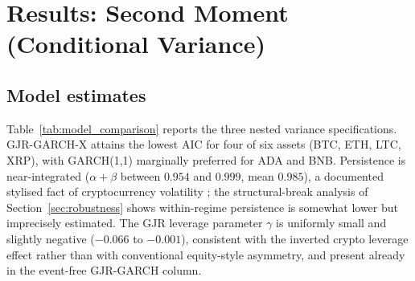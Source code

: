 \documentclass[pdflatex,sn-mathphys-num]{sn-jnl}
\theoremstyle{thmstyleone}
\theoremstyle{thmstyletwo}
\theoremstyle{thmstylethree}
\begin{document}

\section{Results: Second Moment (Conditional Variance)}\label{sec:results_var}

\subsection{Model estimates}

Table~\ref{tab:model_comparison} reports the three nested variance specifications. GJR-GARCH-X attains the lowest AIC for four of six assets (BTC, ETH, LTC, XRP), with GARCH(1,1) marginally preferred for ADA and BNB. Persistence is near-integrated ($\alpha+\beta$ between $0.954$ and $0.999$, mean $0.985$), a documented stylised fact of cryptocurrency volatility \citep{Katsiampa2017, BouriEtAl2017, CheikhEtAl2020}; the structural-break analysis of Section~\ref{sec:robustness} shows within-regime persistence is somewhat lower but imprecisely estimated. The GJR leverage parameter $\gamma$ is uniformly small and slightly negative ($-0.066$ to $-0.001$), consistent with the inverted crypto leverage effect \citep{BaurDimpfl2018} rather than with conventional equity-style asymmetry, and present already in the event-free GJR-GARCH column.
\end{document}
